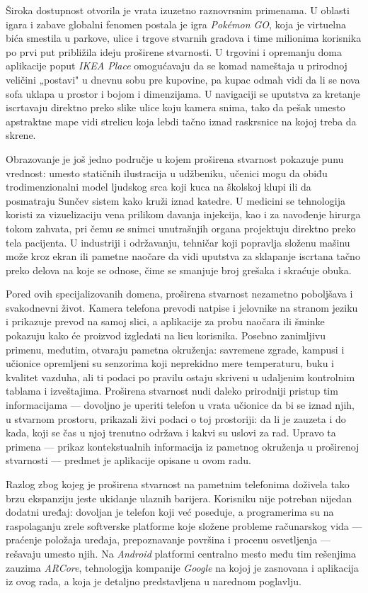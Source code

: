 Široka dostupnost otvorila je vrata izuzetno raznovrsnim primenama. U oblasti igara i zabave globalni fenomen postala je igra \textit{Pokémon GO}, koja je virtuelna bića smestila u parkove, ulice i trgove stvarnih gradova i time milionima korisnika po prvi put približila ideju proširene stvarnosti. U trgovini i opremanju doma aplikacije poput \textit{IKEA Place} omogućavaju da se komad nameštaja u prirodnoj veličini „postavi" u dnevnu sobu pre kupovine, pa kupac odmah vidi da li se nova sofa uklapa u prostor i bojom i dimenzijama. U navigaciji se uputstva za kretanje iscrtavaju direktno preko slike ulice koju kamera snima, tako da pešak umesto apstraktne mape vidi strelicu koja lebdi tačno iznad raskrsnice na kojoj treba da skrene.

Obrazovanje je još jedno područje u kojem proširena stvarnost pokazuje punu vrednost: umesto statičnih ilustracija u udžbeniku, učenici mogu da obiđu trodimenzionalni model ljudskog srca koji kuca na školskoj klupi ili da posmatraju Sunčev sistem kako kruži iznad katedre. U medicini se tehnologija koristi za vizuelizaciju vena prilikom davanja injekcija, kao i za navođenje hirurga tokom zahvata, pri čemu se snimci unutrašnjih organa projektuju direktno preko tela pacijenta. U industriji i održavanju, tehničar koji popravlja složenu mašinu može kroz ekran ili pametne naočare da vidi uputstva za sklapanje iscrtana tačno preko delova na koje se odnose, čime se smanjuje broj grešaka i skraćuje obuka.

Pored ovih specijalizovanih domena, proširena stvarnost nezametno poboljšava i svakodnevni život. Kamera telefona prevodi natpise i jelovnike na stranom jeziku i prikazuje prevod na samoj slici, a aplikacije za probu naočara ili šminke pokazuju kako će proizvod izgledati na licu korisnika. Posebno zanimljivu primenu, međutim, otvaraju pametna okruženja: savremene zgrade, kampusi i učionice opremljeni su senzorima koji neprekidno mere temperaturu, buku i kvalitet vazduha, ali ti podaci po pravilu ostaju skriveni u udaljenim kontrolnim tablama i izveštajima. Proširena stvarnost nudi daleko prirodniji pristup tim informacijama --- dovoljno je uperiti telefon u vrata učionice da bi se iznad njih, u stvarnom prostoru, prikazali živi podaci o toj prostoriji: da li je zauzeta i do kada, koji se čas u njoj trenutno održava i kakvi su uslovi za rad. Upravo ta primena --- prikaz kontekstualnih informacija iz pametnog okruženja u proširenoj stvarnosti --- predmet je aplikacije opisane u ovom radu.

Razlog zbog kojeg je proširena stvarnost na pametnim telefonima doživela tako brzu ekspanziju jeste ukidanje ulaznih barijera. Korisniku nije potreban nijedan dodatni uređaj: dovoljan je telefon koji već poseduje, a programerima su na raspolaganju zrele softverske platforme koje složene probleme računarskog vida --- praćenje položaja uređaja, prepoznavanje površina i procenu osvetljenja --- rešavaju umesto njih. Na \textit{Android} platformi centralno mesto među tim rešenjima zauzima \textit{ARCore}, tehnologija kompanije \textit{Google} na kojoj je zasnovana i aplikacija iz ovog rada, a koja je detaljno predstavljena u narednom poglavlju.

